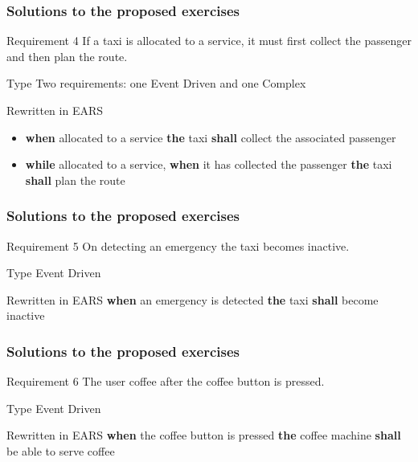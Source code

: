 \documentclass[aspectratio=169]{beamer}
\newcommand{\earse}[3]{{\bf \color{mygreen}when} {#1} {\bf \color{mypurple}the} {#2} {\bf \color{mypurple}shall} {#3}}
\begin{document}
\begin{frame}
  \frametitle{Solutions to the proposed exercises}
  \begin{block}{Requirement 4}
    If a taxi is \alert{allocated} to a service, it must first \alert{collect} the passenger and then \alert{plan} the route.
  \end{block}
  \begin{block}{Type}
   Two requirements: one Event Driven and one Complex
  \end{block}
  \begin{block}{Rewritten in EARS}
  \begin{itemize}
    \item \earse{allocated to a service}{taxi}{collect the associated passenger}
    \item {\bf \color{mygreen} while} allocated to a service, \earse{it has collected the passenger}{taxi}{plan the route}
  \end{itemize}
  \end{block}
\end{frame}

\begin{frame}
  \frametitle{Solutions to the proposed exercises}
  \begin{block}{Requirement 5}
    On detecting an \alert{emergency} the taxi becomes inactive.
  \end{block}
  \begin{block}{Type}
   Event Driven
  \end{block}
  \begin{block}{Rewritten in EARS}
   \earse{an emergency is detected}{taxi}{become inactive}
  \end{block}
\end{frame}

\begin{frame}
  \frametitle{Solutions to the proposed exercises}
  \begin{block}{Requirement 6}
    The user  \alert{coffee} after the \alert{coffee button} is pressed.
  \end{block}
  \begin{block}{Type}
   Event Driven
  \end{block}
  \begin{block}{Rewritten in EARS}
   \earse{the coffee button is pressed}{coffee machine}{be able to serve coffee}
  \end{block}
\end{frame}
\end{document}

